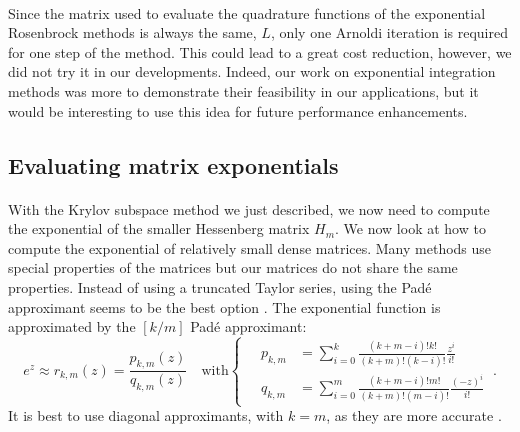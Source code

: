       \paragraph{}
      Since the matrix used to evaluate the quadrature functions of the exponential Rosenbrock methods is always the same, $L$, only one Arnoldi iteration is required for one step of the method.
      This could lead to a great cost reduction, however, we did not try it in our developments.
      Indeed, our work on exponential integration methods was more to demonstrate their feasibility in our applications, but it would be interesting to use this idea for future performance enhancements.


    \subsection{Evaluating matrix exponentials}

      \paragraph{}
      With the Krylov subspace method we just described, we now need to compute the exponential of the smaller Hessenberg matrix $H_m$.
      We now look at how to compute the exponential of relatively small dense matrices.
      Many methods use special properties of the matrices but our matrices do not share the same properties.
      Instead of using a truncated Taylor series, using the Padé approximant seems to be the best option \cite{HighamAlMohy2010}.
      The exponential function is approximated by the $\left[k/m\right]$ Padé approximant:
      \begin{equation}
        e^z \approx r_{k,m}\left(z\right) = \frac{p_{k,m}\left(z\right)}{q_{k,m}\left(z\right)} \quad\textrm{with} \left\{\begin{aligned}
          \quad p_{k,m} &= \sum_{i = 0}^k \frac{\left(k + m - i\right)! k!}{\left(k + m\right)! \left(k - i\right)!} \frac{z^i}{i!} \\
          \quad q_{k,m} &= \sum_{i = 0}^m \frac{\left(k + m - i\right)! m!}{\left(k + m\right)! \left(m - i\right)!} \frac{\left(-z\right)^i}{i!}
        \end{aligned}\right. \ .
      \end{equation}
      It is best to use diagonal approximants, with $k = m$, as they are more accurate \cite{HighamAlMohy2010}.

